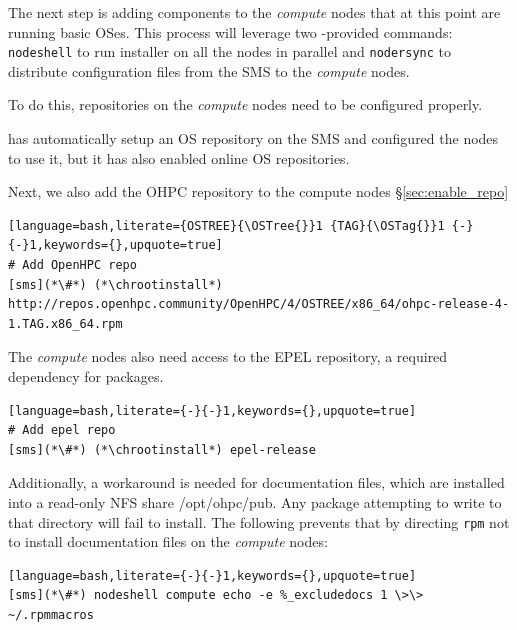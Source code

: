 
The next step is adding \OHPC{} components to the {\em compute} nodes that at this
point are running basic OSes.  This process will leverage two \Confluent{}-provided
commands: \texttt{nodeshell} to run \texttt{\pkgmgr{}} installer on all the
nodes in parallel  and \texttt{nodersync} to distribute configuration files from the
SMS to the {\em compute} nodes.

\noindent To do this, repositories on the {\em compute} nodes need to be configured
properly.

\Confluent{} has automatically setup an  OS repository on the SMS and configured the
nodes to use it, but it has  also enabled online OS repositories.


\noindent Next, we also add the OHPC repository to the compute nodes
\S\ref{sec:enable_repo}

\begin{lstlisting}[language=bash,literate={OSTREE}{\OSTree{}}1 {TAG}{\OSTag{}}1 {-}{-}1,keywords={},upquote=true]
# Add OpenHPC repo
[sms](*\#*) (*\chrootinstall*) http://repos.openhpc.community/OpenHPC/4/OSTREE/x86_64/ohpc-release-4-1.TAG.x86_64.rpm
\end{lstlisting}

The {\em compute} nodes also need access to the EPEL repository, a required
dependency for \OHPC{} packages.

\begin{lstlisting}[language=bash,literate={-}{-}1,keywords={},upquote=true]
# Add epel repo
[sms](*\#*) (*\chrootinstall*) epel-release

\end{lstlisting}


\noindent Additionally, a workaround is needed for \OHPC{} documentation files,
which are installed into a read-only NFS share /opt/ohpc/pub. Any package
attempting to write to that directory will fail to install. The following
prevents that by directing \texttt{rpm} not to install documentation files on
the {\em compute} nodes:

\begin{lstlisting}[language=bash,literate={-}{-}1,keywords={},upquote=true]
[sms](*\#*) nodeshell compute echo -e %_excludedocs 1 \>\> ~/.rpmmacros
\end{lstlisting}

